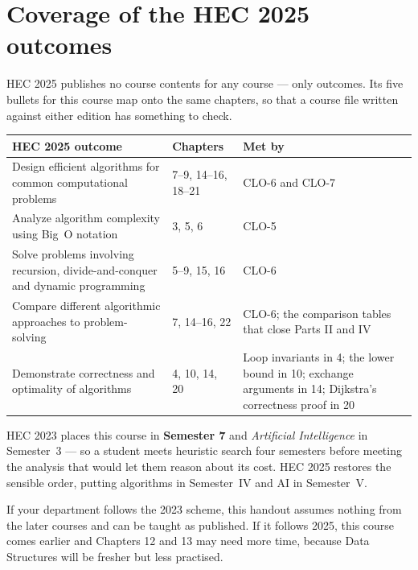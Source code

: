 \section*{Coverage of the HEC 2025 outcomes}

HEC 2025 publishes no course contents for any course --- only outcomes. Its
five bullets for this course map onto the same chapters, so that a course file
written against either edition has something to check.

\begin{longtable}{@{}L{7.6cm}L{2.6cm}L{4.8cm}@{}}
\toprule
{}
\textbf{HEC 2025 outcome} & \textbf{Chapters} & \textbf{Met by} \\
\midrule
\endhead
Design efficient algorithms for common computational problems & 7--9, 14--16,
18--21 & CLO-6 and CLO-7 \\
Analyze algorithm complexity using Big~O notation & 3, 5, 6 & CLO-5 \\
Solve problems involving recursion, divide-and-conquer and dynamic
programming & 5--9, 15, 16 & CLO-6 \\
Compare different algorithmic approaches to problem-solving & 7, 14--16, 22 &
CLO-6; the comparison tables that close Parts II and IV \\
Demonstrate correctness and optimality of algorithms & 4, 10, 14, 20 & Loop
invariants in 4; the lower bound in 10; exchange arguments in 14; Dijkstra's
correctness proof in 20 \\
\bottomrule
\end{longtable}

\begin{alertbox}
HEC 2023 places this course in \textbf{Semester 7} and \emph{Artificial
Intelligence} in Semester~3 --- so a student meets heuristic search four
semesters before meeting the analysis that would let them reason about its
cost. HEC 2025 restores the sensible order, putting algorithms in Semester~IV
and AI in Semester~V.

\smallskip
If your department follows the 2023 scheme, this handout assumes nothing from
the later courses and can be taught as published. If it follows 2025, this
course comes earlier and Chapters 12 and 13 may need more time, because Data
Structures will be fresher but less practised.
\end{alertbox}

\newpage

